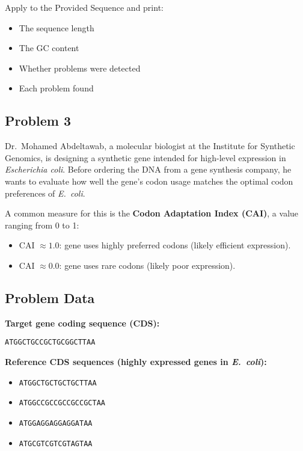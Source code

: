 \documentclass[12pt]{article}
\begin{document}
Apply to the Provided Sequence and print:
\begin{itemize}[leftmargin=1.2cm]
    \item The sequence length
    \item The GC content
    \item Whether problems were detected
    \item Each problem found
\end{itemize}

\newpage
\subsection{Problem 3}
Dr.~Mohamed Abdeltawab, a molecular biologist at the Institute for Synthetic Genomics, is designing a synthetic gene intended for high-level expression in \textit{Escherichia coli}. Before ordering the DNA from a gene synthesis company, he wants to evaluate how well the gene’s codon usage matches the optimal codon preferences of \textit{E.~coli}.

A common measure for this is the \textbf{Codon Adaptation Index (CAI)}, a value ranging from 0 to 1:
\begin{itemize}[leftmargin=1.2cm]
    \item CAI $\approx 1.0$: gene uses highly preferred codons (likely efficient expression).
    \item CAI $\approx 0.0$: gene uses rare codons (likely poor expression).
\end{itemize}

\subsection*{Problem Data}
\textbf{Target gene coding sequence (CDS):}
\begin{center}
\texttt{ATGGCTGCCGCTGCGGCTTAA}
\end{center}

\textbf{Reference CDS sequences (highly expressed genes in \textit{E.~coli}):}
\begin{itemize}[leftmargin=2cm]
    \item \texttt{ATGGCTGCTGCTGCTTAA}
    \item \texttt{ATGGCCGCCGCCGCCGCTAA}
    \item \texttt{ATGGAGGAGGAGGATAA}
    \item \texttt{ATGCGTCGTCGTAGTAA}
\end{itemize}
\end{document}
